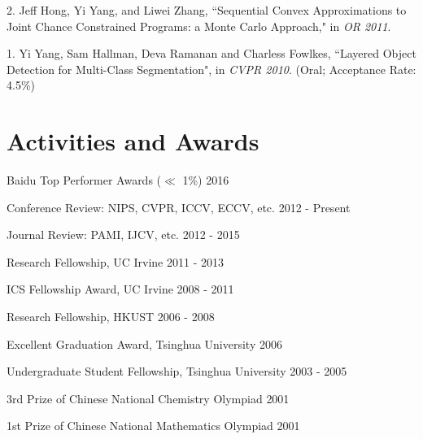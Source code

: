 \documentclass[margin]{res3}
\newenvironment{list1}{
  \begin{list}{\ding{113}}{%
      \setlength{\itemsep}{0.03in}
      \setlength{\parsep}{0in} \setlength{\parskip}{0in}
      \setlength{\topsep}{0in} \setlength{\partopsep}{0in}
      \setlength{\leftmargin}{0in}}}{\end{list}}
\begin{document}
\begin{resume}
\begin{list1}
\item[] 2. Jeff Hong, Yi Yang, and Liwei Zhang,
``Sequential Convex Approximations to Joint Chance Constrained Programs: a Monte Carlo Approach,"
in \textit{OR 2011}.

\item[] 1. Yi Yang, Sam Hallman, Deva Ramanan and Charless Fowlkes,
``Layered Object Detection for Multi-Class Segmentation",
in \textit{CVPR 2010}. (Oral; Acceptance Rate: 4.5\%)

\end{list1}


\section{\sc Activities and Awards}

\begin{list1}
\item[] Baidu Top Performer Awards ($\ll$ 1\%) \hfill{2016}

\item[] Conference Review: NIPS, CVPR, ICCV, ECCV, etc. \hfill{2012 - Present}

\item[] Journal Review: PAMI, IJCV, etc. \hfill{2012 - 2015}

\item[] Research Fellowship, UC Irvine \hfill{2011 - 2013}

\item[]	ICS Fellowship Award, UC Irvine \hfill{2008 - 2011}

\item[]	Research Fellowship, HKUST \hfill{2006 - 2008}

\item[]	Excellent Graduation Award, Tsinghua University \hfill{2006}

\item[] Undergraduate Student Fellowship, Tsinghua University \hfill{2003 - 2005}

\item[] 3rd Prize of Chinese National Chemistry Olympiad \hfill{2001}

\item[] 1st Prize of Chinese National Mathematics Olympiad \hfill{2001}


\end{list1}
\end{resume}
\end{document}
